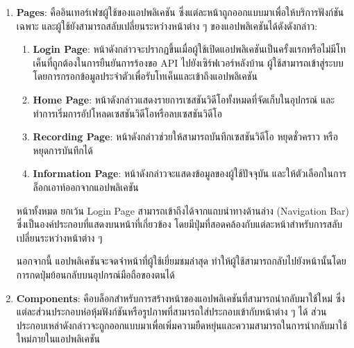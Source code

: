 \else
\begin{enumerate}
    \item \textbf{Pages}: คืออินเทอร์เฟซผู้ใช้ของแอปพลิเคชัน ซึ่งแต่ละหน้าถูกออกแบบมาเพื่อให้บริการฟังก์ชันเฉพาะ และผู้ใช้ยังสามารถสลับเปลี่ยนระหว่างหน้าต่าง ๆ ของแอปพลิเคชันได้ดังดังกล่าว:  
    \begin{enumerate}  
        \item \textbf{Login Page}: หน้าดังกล่าวจะปรากฏขึ้นเมื่อผู้ใช้เปิดแอปพลิเคชันเป็นครั้งแรกหรือไม่มีโทเค็นที่ถูกต้องในการยืนยันการร้องขอ API ไปยังเซิร์ฟเวอร์หลังบ้าน ผู้ใช้สามารถเข้าสู่ระบบโดยการกรอกข้อมูลประจำตัวเพื่อรับโทเค็นและเข้าถึงแอปพลิเคชัน  
        \item \textbf{Home Page}: หน้าดังกล่าวแสดงรายการเซสชันวิดีโอทั้งหมดที่จัดเก็บในอุปกรณ์  และทำการเริ่มการอัปโหลดเซสชันวิดีโอหรือลบเซสชันวิดีโอ  
        \item \textbf{Recording Page}: หน้าดังกล่าวช่วยให้สามารถบันทึกเซสชันวิดีโอ  หยุดชั่วคราว หรือหยุดการบันทึกได้  
        \item \textbf{Information Page}: หน้าดังกล่าวจะแสดงข้อมูลของผู้ใช้ปัจจุบัน และให้ตัวเลือกในการล็อกเอาท์ออกจากแอปพลิเคชัน
    \end{enumerate}  
    หน้าทั้งหมด ยกเว้น Login Page  สามารถเข้าถึงได้จากแถบนำทางด้านล่าง (Navigation Bar) ซึ่งเป็นองค์ประกอบที่แสดงบนหน้าที่เกี่ยวข้อง โดยมีปุ่มที่สอดคล้องกับแต่ละหน้าสำหรับการสลับเปลี่ยนระหว่างหน้าต่าง ๆ  
    
    นอกจากนี้ แอปพลิเคชันจะจดจำหน้าที่ผู้ใช้เยี่ยมชมล่าสุด ทำให้ผู้ใช้สามารถกลับไปยังหน้านั้นโดยการกดปุ่มย้อนกลับบนอุปกรณ์มือถือของตนได้      

    \item \textbf{Components}: คือบล็อกสำหรับการสร้างหน้าของแอปพลิเคชันที่สามารถนำกลับมาใช้ใหม่ ซึ่งแต่ละส่วนประกอบห่อหุ้มฟังก์ชันหรือรูปภาพที่สามารถใส่ประกอบเข้ากับหน้าต่าง ๆ ได้ ส่วนประกอบเหล่าดังกล่าวจะถูกออกแบบมาเพื่อเพิ่มความยืดหยุ่นและความสามารถในการนำกลับมาใช้ใหม่ภายในแอปพลิเคชัน
    

\end{enumerate}
